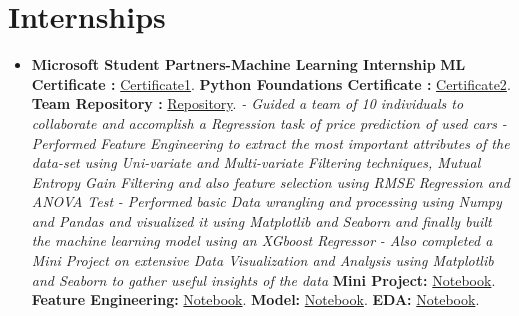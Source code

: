 \documentclass[a4paper,12pt]{article}
\begin{document}
\section*{Internships}
\begin{itemize}
    \item{\textbf{\large{Microsoft Student Partners-Machine Learning Internship}}
          \newline
          \textbf{ ML Certificate :} \href{https://github.com/teetangh/Kaustav-All-Certifications/blob/master/Artificial%20Intelligence/MSP%20ML%20Internship/internship%20certificate.jpg}{Certificate1}.
          \textbf{ Python Foundations Certificate :} \href{https://github.com/teetangh/Kaustav-All-Certifications/blob/master/Artificial%20Intelligence/MSP%20ML%20Internship/Course%20Completion%20Certificate.jpg}{Certificate2}.
          \textbf{ Team Repository :} \href{https://github.com/Microsoft-ML-Internship-Team/Major-Project-Submissions}{Repository}.
          \newline
          \textit{- Guided a team of 10 individuals to collaborate and accomplish a Regression task of price prediction of used cars}
          \newline
          \textit{- Performed Feature Engineering to extract the most important attributes of the data-set using Uni-variate and Multi-variate Filtering techniques, Mutual Entropy Gain Filtering and also feature selection using RMSE Regression and ANOVA Test  }
          \newline
          \textit{- Performed basic Data wrangling and processing using Numpy and Pandas and visualized it using Matplotlib and Seaborn and finally built the machine learning model using an XGboost Regressor }
          \newline
          \textit{- Also completed a Mini Project on extensive Data Visualization and Analysis using Matplotlib and Seaborn to gather useful insights of the data}
          \newline
          \textbf{ Mini Project:} \href{https://github.com/teetangh/Microsoft-Machine-Learning-Internship/blob/master/MINOR%20PROJECT/Microsoft_Minor_Project_v2.ipynb}{Notebook}.
              \newline
              \textbf{ Feature Engineering:} \href{https://github.com/Microsoft-ML-Internship-Team/Major-Project-Submissions/blob/master/KAUSTAV/02_Kaustav_feature_engineering_v4.ipynb}{Notebook}.
              \textbf{ Model:} \href{https://github.com/Microsoft-ML-Internship-Team/Major-Project-Submissions/blob/master/KAUSTAV/03_Kaustav_Buidling_the_model_v1.ipynb}{Notebook}.
              \textbf{ EDA:} \href{https://github.com/Microsoft-ML-Internship-Team/Major-Project-Submissions/blob/master/KAUSTAV/01_Kaustav_data_preprocess_EDA_v7.ipynb}{Notebook}.}
\end{itemize}
\end{document}

